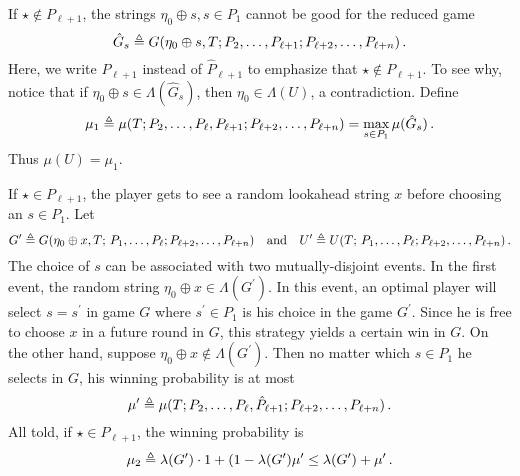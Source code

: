     If $\star \not \in P_{\ell + 1}$, 
    the strings $\eta_0 \oplus s, s \in P_1$ 
    cannot be good for the reduced game  
    \[
        \hat{G}_s \triangleq G(\eta_0 \oplus s, T; P_2, \ldots, P_{\ell + 1}; P_{\ell+{2}}, \ldots, P_{\ell + n})
        \,. 
    \]
    Here, we write $P_{\ell + 1}$ instead of $\hat{P}_{\ell + 1}$ 
    to emphasize that $\star \not \in P_{\ell + 1}$. 
    To see why, notice that if $\eta_0 \oplus s \in \Lambda(\hat{G}_s)$, 
    then $\eta_0 \in \Lambda(U)$, a contradiction. 
    Define 
    \[
        \mu_1 \triangleq \mu(T; P_2, \ldots, P_\ell, P_{\ell + 1}; P_{\ell+{2}}, \ldots, P_{\ell + n}) = \max_{s \in P_1} \mu(\hat{G}_s)
        \,.
    \] 
    Thus $\mu(U) = \mu_1$.


    If $\star \in P_{\ell + 1}$, 
    the player gets to see a random lookahead string $x$ 
    before choosing an $s \in P_1$. 
    Let
    \[
        G^\prime \triangleq G(\eta_0 \oplus x, T;\,P_{1}, \ldots, P_{\ell}; P_{\ell+{2}}, \ldots, P_{\ell + n})
        \quad\text{and}\quad
        U^\prime \triangleq U(T;\,P_{1}, \ldots, P_{\ell}; P_{\ell+{2}}, \ldots, P_{\ell + n})
        \,.
    \]
    The choice of $s$ 
    can be associated with two mutually-disjoint events. 
    In the first event, 
    the random string $\eta_0 \oplus x \in \Lambda(G^\prime)$. 
    In this event, 
    an optimal player will select $s = s^\prime$ in game $G$ 
    where $s^\prime \in P_1$ is his choice in the game $G^\prime$. 
    Since he is free to choose $x$ in a future round in $G$, 
    this strategy yields a certain win in $G$.
    On the other hand, 
    suppose $\eta_0 \oplus x \not \in \Lambda(G^\prime)$. 
    Then no matter which $s \in P_1$ he selects in $G$, 
    his winning probability is at most 
    \[
        \mu^\prime \triangleq \mu(T; P_{2}, \ldots, P_{\ell}, \hat{P}_{\ell + 1}; P_{\ell+{2}}, \ldots, P_{\ell + n})
        \,. 
    \]
    All told, if $\star \in P_{\ell + 1}$, 
    the winning probability is 
    \[
        \mu_2 \triangleq \lambda(G^\prime)\cdot 1 + (1 - \lambda(G^\prime) \mu^\prime 
        \leq \lambda(G^\prime) + \mu^\prime
        \,.
    \] 
    
